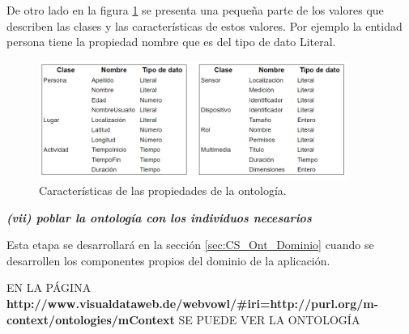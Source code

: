 De otro lado en la figura \ref{fig:Contexto_Modelado_TipoDato} se presenta una pequeña parte de los valores que describen las clases y las características de estos valores. Por ejemplo la entidad persona tiene la propiedad nombre que es del tipo de dato Literal.

\begin{figure}[ht]
\centering%
\includegraphics[width=0.9\textwidth]{Cap3/Images/Contexto_Modelado_Caract_Relaciones}%
\caption{Características de las propiedades de la ontología.} \label{fig:Contexto_Modelado_TipoDato}
\end{figure}



\textbf{\textit{(vii) poblar la ontología con los individuos necesarios}}

Esta etapa se desarrollará en la sección \ref{sec:CS_Ont_Dominio} cuando se desarrollen los componentes propios del dominio de la aplicación.




EN LA PÁGINA \textbf{http://www.visualdataweb.de/webvowl/#iri=http://purl.org/m-context/ontologies/mContext} SE PUEDE VER LA ONTOLOGÍA 